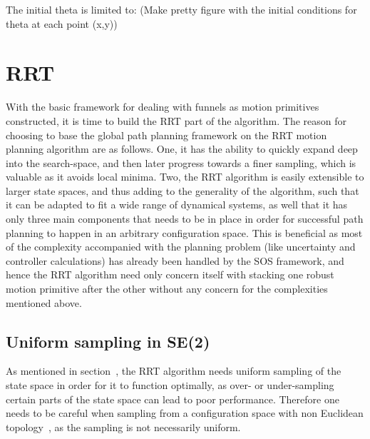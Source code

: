 The initial theta is limited to: (Make pretty figure with the initial conditions
for theta at each point (x,y))

\section{RRT}
\label{sec:RRT}

With the basic framework for dealing with funnels as motion primitives
constructed, it is time to build the \ac{RRT} part of the \rrtfunnel{}
algorithm. The reason for choosing to base the global path planning framework on
the \ac{RRT} motion planning algorithm are as follows. One, it has the ability
to quickly expand deep into the search-space, and then later progress towards a
finer sampling, which is valuable as it avoids local minima. Two, the \ac{RRT}
algorithm is easily extensible to larger state spaces, and thus adding to the
generality of the \rrtfunnel{} algorithm, such that it can be adapted to fit a
wide range of dynamical systems, as well that it has only three main components
that needs to be in place in order for successful path planning to happen in an
arbitrary configuration space. This is beneficial as most of the complexity
accompanied with the planning problem (like uncertainty and controller
calculations) has already been handled by the \ac{SOS} framework, and hence the
\ac{RRT} algorithm need only concern itself with stacking one robust motion
primitive after the other without any concern for the complexities mentioned
above.

\subsection{Uniform sampling in SE(2)}

As mentioned in section~, the \ac{RRT}
algorithm needs uniform sampling of the state space in order for it to function
optimally, as over- or under-sampling certain parts of the state space can lead
to poor performance. Therefore one needs to be careful when sampling from a
configuration space with non Euclidean
topology~\cite{kuffnerEffectiveSamplingDistance2004}, as the sampling is not
necessarily uniform.

